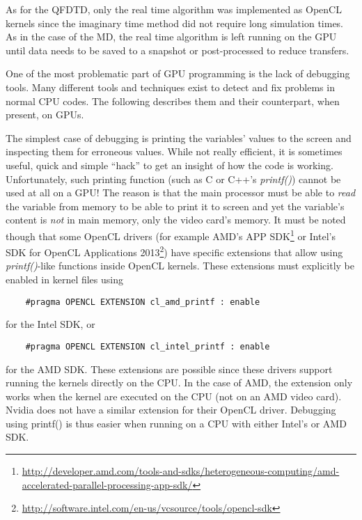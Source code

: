 
As for the QFDTD, only the real time algorithm was implemented as OpenCL
kernels since the imaginary time method did not require long simulation times.
As in the case of the MD, the real time algorithm is left running on the GPU
until data needs to be saved to a snapshot or post-processed to reduce
transfers.




One of the most problematic part of GPU programming is the lack of debugging
tools. Many different tools and techniques exist to detect and fix problems in
normal CPU codes. The following describes them and their counterpart, when present,
on GPUs.



The simplest case of debugging is printing the variables' values to the screen
and inspecting them for
erroneous values. While not really efficient, it is sometimes useful, quick
and simple ``hack'' to get an insight of how the code is working. Unfortunately,
such printing function (such as C or C++'s \textit{printf()}) cannot be used at
all on a GPU! The reason is that the main processor must be able to
\textit{read} the variable from memory to be able to print it to screen and yet
the variable's content is \textit{not} in main memory, only the video card's
memory. It must be noted though that some OpenCL drivers (for example AMD's
APP SDK\footnote{\url{http://developer.amd.com/tools-and-sdks/heterogeneous-computing/amd-accelerated-parallel-processing-app-sdk/}}
or Intel's SDK for OpenCL Applications
2013\footnote{\url{http://software.intel.com/en-us/vcsource/tools/opencl-sdk}})
have specific extensions that allow using \textit{printf()}-like functions
inside OpenCL kernels. These extensions must explicitly be enabled in kernel
files using
\begin{verbatim}
    #pragma OPENCL EXTENSION cl_amd_printf : enable
\end{verbatim}
for the Intel SDK, or
\begin{verbatim}
    #pragma OPENCL EXTENSION cl_intel_printf : enable
\end{verbatim}
for the AMD SDK. These extensions are possible since these drivers support
running the kernels directly on the CPU. In the case of AMD, the extension only
works when the kernel are executed on the CPU (not on an AMD video card). Nvidia
does not have a similar extension for their OpenCL driver. Debugging using
printf() is thus easier when running on a CPU with either Intel's or AMD SDK.


